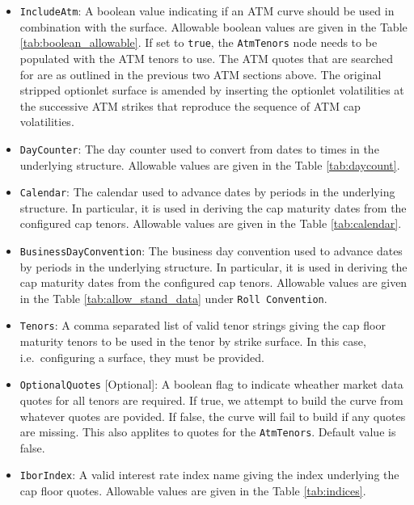 \begin{itemize}
\item \lstinline!IncludeAtm!:
A boolean value indicating if an ATM curve should be used in combination with the surface. Allowable boolean values are given in the Table \ref{tab:boolean_allowable}. If set to \lstinline!true!, the \lstinline!AtmTenors! node needs to be populated with the ATM tenors to use. The ATM quotes that are searched for are as outlined in the previous two ATM sections above. The original stripped optionlet surface is amended by inserting the optionlet volatilities at the successive ATM strikes that reproduce the sequence of ATM cap volatilities.

\item \lstinline!DayCounter!:
The day counter used to convert from dates to times in the underlying structure. Allowable values are given in the Table \ref{tab:daycount}.

\item \lstinline!Calendar!:
The calendar used to advance dates by periods in the underlying structure. In particular, it is used in deriving the cap maturity dates from the configured cap tenors. Allowable values are given in the Table \ref{tab:calendar}.

\item \lstinline!BusinessDayConvention!:
The business day convention used to advance dates by periods in the underlying structure. In particular, it is used in deriving the cap maturity dates from the configured cap tenors. Allowable values are given in the Table \ref{tab:allow_stand_data} under \lstinline!Roll Convention!.

\item \lstinline!Tenors!:
A comma separated list of valid tenor strings giving the cap floor maturity tenors to be used in the tenor by strike surface. In this case, i.e.\ configuring a surface, they must be provided.

\item \lstinline!OptionalQuotes! [Optional]:
A boolean flag to indicate wheather market data quotes for all tenors are required. If true, we attempt to build the curve from whatever quotes are povided. If false, the curve will fail to build if any quotes are missing. This also applites to quotes for the \lstinline!AtmTenors!. Default value is false.

\item \lstinline!IborIndex!:
A valid interest rate index name giving the index underlying the cap floor quotes. Allowable values are given in the Table \ref{tab:indices}.


\end{itemize}
